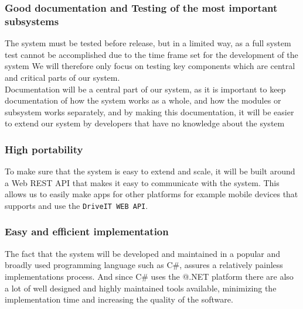 \subsubsection{Good documentation and Testing of the most important subsystems}
The system must be tested before release, but in a limited way, as a full system test cannot be accomplished due to the time frame set for the development of the system We will therefore only focus on testing key components which are central and critical parts of our system.\\

Documentation will be a central part of our system, as it is important to keep documentation of how the system works as a whole, and how the modules or subsystem works separately, and by making this documentation, it will be easier to extend our system by developers that have no knowledge about the system\\

\subsubsection{High portability}
To make sure that the system is easy to extend and scale, it will be built around a Web REST API that makes it easy to communicate with the system. This allows us to easily make apps for other platforms for example mobile devices that supports and use the \texttt{DriveIT WEB API}.\\

\subsubsection{Easy and efficient implementation}
The fact that the system will be developed and maintained in a popular and broadly used programming language such as C\#, assures a relatively painless implementations process. And since C\# uses the @.NET platform there are also a lot of well designed and highly maintained tools available, minimizing the implementation time and increasing the quality of the software.
